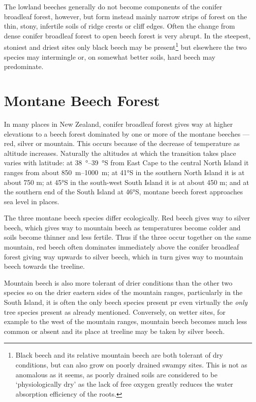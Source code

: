 The lowland beeches generally do not become components of the conifer broadleaf forest, however, but form instead mainly narrow strips of forest on the thin, stony, infertile soils of ridge crests or cliff edges.
Often the change from dense conifer broadleaf forest to open beech forest is very abrupt.
In the steepest, stoniest and driest sites only black beech may be present\footnote{Black beech and its relative mountain beech are both tolerant of dry conditions, but can also grow on poorly drained swampy sites. This is not as anomalous as it seems, as poorly drained soils are considered to be `physiologically dry' as the lack of free oxygen greatly reduces the water absorption efficiency of the roots.} but elsewhere the two species may intermingle or, on somewhat better soils, hard beech may predominate.

\section{Montane Beech Forest}

In many places in New Zealand, conifer broadleaf forest gives way at higher elevations to a beech forest dominated by one or more of the montane beeches --- red, silver or mountain.
This occurs because of the decrease of temperature as altitude increases.
Naturally the altitudes at which the transition takes place varies with latitude: at \SIrange{38}{39}{\degree}S from East Cape to the central North Island it ranges from about \SIrange{850}{1000}{\metre}; at \ang{41}S in the southern North Island it is at about 750 m; at \ang{45}S in the south-west South Island it is at about 450 m; and at the southern end of the South Island at \ang{46}S, montane beech forest approaches sea level in places.

The three montane beech species differ ecologically.
Red beech gives way to silver beech, which gives way to mountain beech as temperatures become colder and soils become thinner and less fertile.
Thus if the three occur together on the same mountain, red beech often dominates immediately above the conifer broadleaf forest giving way upwards to silver beech, which in turn gives way to mountain beech towards the treeline.

Mountain beech is also more tolerant of drier conditions than the other two species so on the drier eastern sides of the mountain ranges, particularly in the South Island, it is often the only beech species present pr even virtually the \emph{only} tree species present as already mentioned.
Conversely, on wetter sites, for example to the west of the mountain ranges, mountain beech becomes much less common or absent and its place at treeline may be taken by silver beech.

